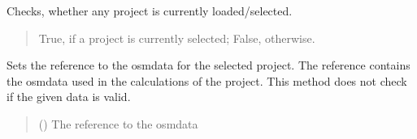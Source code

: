 \documentclass[letterpaper,10pt,english]{sphinxmanual}
\begin{document}
\begin{fulllineitems}
\begin{fulllineitems}
\begin{quote}
\begin{description}
\end{description}\end{quote}

\end{fulllineitems}


\begin{fulllineitems}
\label{\detokenize{apidoc/src.osm_configurator.control:src.osm_configurator.control.control_interface.IControl.is_project_loaded}}
\pysigstartsignatures
{}
\pysigstopsignatures
\sphinxAtStartPar
Checks, whether any project is currently loaded/selected.
\begin{quote}\begin{description}
\sphinxAtStartPar
True, if a project is currently selected; False, otherwise.

\sphinxAtStartPar
{}

\end{description}\end{quote}

\end{fulllineitems}


\begin{fulllineitems}
\label{\detokenize{apidoc/src.osm_configurator.control:src.osm_configurator.control.control_interface.IControl.set_osm_data_reference}}
\pysigstartsignatures
{}
\pysigstopsignatures
\sphinxAtStartPar
Sets the reference to the osm\sphinxhyphen{}data for the selected project.
The reference contains the osm\sphinxhyphen{}data used in the calculations of the project. This method does not check if the given data is valid.
\begin{quote}\begin{description}
\sphinxAtStartPar
{} () \textendash{} The reference to the osm\sphinxhyphen{}data


\end{description}
\end{quote}
\end{fulllineitems}
\end{fulllineitems}
\end{document}
